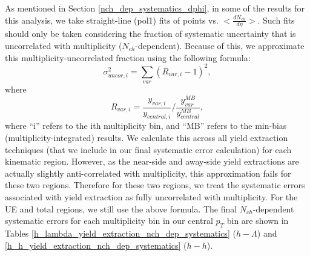 \documentclass[ALICE,manyauthors]{ALICE_analysis_notes}
\begin{document}
\label{nch_dep_systematics_yield}
As mentioned in Section \ref{nch_dep_systematics_dphi}, in some of the results for this analysis, we take straight-line (pol1) fits of points vs. $<\frac{dN_{ch}}{d\eta}>$. Such fits should only be taken considering the fraction of systematic uncertainty that is uncorrelated with multiplicity ($N_{ch}$-dependent). Because of this, we approximate this multiplicity-uncorrelated fraction using the following formula:
\begin{equation}
\sigma_{uncor, i}^2 = \sum_{var}(R_{var, i} - 1)^2,
\end{equation}
where 
\begin{equation}
R_{var, i} = \frac{y_{var, i}}{y_{central, i}}/ \frac{y_{var}^{MB}}{y_{central}^{MB}},
\end{equation}
where ``i'' refers to the ith multiplicity bin, and ``MB'' refers to the min-bias (multiplicity-integrated) results. We calculate this across all yield extraction techniques (that we include in our final systematic error calculation) for each kinematic region. However, as the near-side and away-side yield extractions are actually slightly anti-correlated with multiplicity, this approximation fails for these two regions. Therefore for these two regions, we treat the systematic errors associated with yield extraction as fully uncorrelated with multiplicity. For the UE and total regions, we still use the above formula. The final $N_{ch}$-dependent systematic errors for each multiplicity bin in our central $p_{T}$ bin are shown in Tables \ref{h_lambda_yield_extraction_nch_dep_systematics} ($h-\Lambda$) and \ref{h_h_yield_extraction_nch_dep_systematics} ($h-h$).
\end{document}
